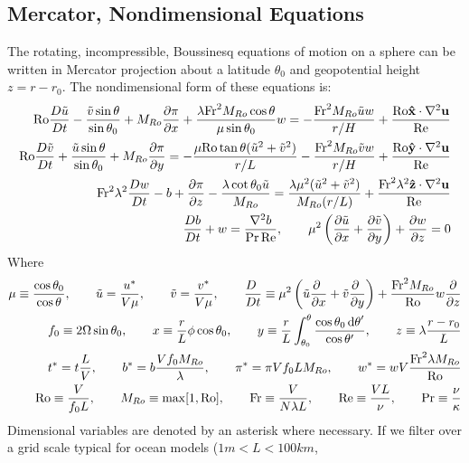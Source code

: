 
\subsection{Mercator, Nondimensional Equations}
The rotating, incompressible, Boussinesq equations of motion
\citep{Gill1982} on a sphere can be written in Mercator projection
about a latitude $\theta_0$ and geopotential height $z=r-r_0$.  The
nondimensional form of these equations is:
\begin{eqnarray}
\Ro\Dt\tu- \frac{\tv \sin\theta}{\sin\theta_0}+\Mr\pd{x}{\pi}+\frac{\lambda\Fr^2\Mr\cos \theta}{\mu\sin\theta_0} w=-\frac{\Fr^2\Mr \tu w}{r/H}+\frac{\Ro{\bf \hat x}\cdot\nabla^2{\bf u}}{\Re}\nonumber\\
\Ro\Dt\tv+ \frac{\tu\sin\theta}{\sin\theta_0}+\Mr\pd{y}{\pi}=-\frac{\mu\Ro\tan\theta(\tu^2+\tv^2)}{r/L} -\frac{\Fr^2\Mr \tv w}{r/H}+\frac{\Ro{\bf \hat y}\cdot\nabla^2{\bf u}}{\Re}\nonumber\\
\Fr^2\lambda^2\Dt w -b+\pd{z}{\pi}-\frac{\lambda\cot \theta_0 \tu}{\Mr}=\frac{\lambda\mu^2(\tu^2+\tv^2)}{\Mr(r/L)}+\frac{\Fr^2\lambda^2{\bf \hat z}\cdot\nabla^2{\bf u}}{\Re}\nonumber\\
\Dt b+w=\frac{\nabla^2 b}{\Pr\Re}\nonumber, \qquad
\mu^2\left(\pd x\tu  + \pd y\tv \right)+\pd z w =0\nonumber
\end{eqnarray}
Where 
\begin{eqnarray}
\mu\equiv\frac{\cos\theta_0}{\cos\theta},\qquad\tu=\frac{u^*}{V\mu},\qquad\tv=\frac{v^*}{V\mu} , \qquad \Dt\ \equiv \mu^2\left(\tu\pd x\  +\tv \pd y\ \right)+\frac{\Fr^2\Mr}{\Ro} w\pd z \nonumber \\
f_0\equiv2\Omega\sin\theta_0,\qquad x\equiv \frac{r}{L} \phi \cos \theta_0, \qquad y\equiv \frac{r}{L} \int_{\theta_0}^\theta\frac{\cos \theta_0 \d \theta'}{\cos\theta'}, \qquad z\equiv \lambda\frac{r-r_0}{L}\nonumber\\
t^*=t \frac{L}{V},\qquad b^*= b\frac{V f_0\Mr}{\lambda},\qquad \pi^*=\pi V f_0 L\Mr,\qquad w^*=w V \frac{\Fr^2\lambda\Mr}{\Ro}\nonumber\\
\Ro\equiv\frac{V}{f_0 L},\qquad \Mr\equiv \max[1,\Ro], \qquad \Fr\equiv\frac{V}{N \lambda L}, \qquad \Re\equiv\frac{VL}{\nu}, \qquad \Pr\equiv\frac{\nu}{\kappa}\nonumber
\end{eqnarray}
Dimensional variables are denoted by an asterisk where necessary.  If
we filter over a grid scale typical for ocean models ($1m<L<100km$,
